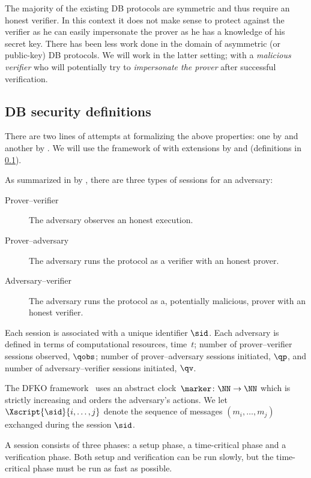 The majority of the existing \ac{DB} protocols are symmetric and thus require an honest verifier.
In this context it does not make sense to protect against the verifier as he 
can easily impersonate the prover as he has a knowledge of his secret key.
There has been less work done in the domain of asymmetric (or public-key) \ac{DB} protocols.
We will work in the latter setting; with a \emph{malicious verifier} who will 
potentially try to \emph{impersonate the prover} after successful verification.

\subsection{\Acl*{DB} security definitions}%
\label{DB-definitions}

There are two lines of attempts at formalizing the above properties: one by 
\citet{DB-BMV} and another by \citet{DB-DFKO}.
We will use the framework of \citeauthor{DB-DFKO} with extensions by 
\textcite{FormalTerroristFraud} and \textcite{TREAD} (definitions in 
\cref{DB-definitions}).

As summarized in by \textcite{TREAD}, there are three types of sessions for an 
adversary:
\begin{description}
  \item[Prover--verifier] The adversary observes an honest execution.
  \item[Prover--adversary] The adversary runs the protocol as a verifier with 
    an honest prover.
  \item[Adversary--verifier] The adversary runs the protocol as a, potentially 
    malicious, prover with an honest verifier.
\end{description}
Each session is associated with a unique identifier \(\sid\).
Each adversary is defined in terms of
computational resources, time~\(t\);
number of prover--verifier sessions observed, \(\qobs\);
number of prover--adversary sessions initiated, \(\qp\), and
number of adversary--verifier sessions initiated, \(\qv\).

The DFKO framework~\cite{DB-DFKO} uses an abstract clock~\(\marker\colon \NN\to 
  \NN\) which is strictly increasing and orders the adversary's actions.
We let
\(\Xscript{\sid}{i, \dotsc, j}\)
denote the sequence of messages
\((m_i, \dotsc, m_j)\)
exchanged during the session \(\sid\).

A session consists of three phases: a setup phase, a time-critical phase and a 
verification phase.
Both setup and verification can be run slowly, but the time-critical phase must 
be run as fast as possible.

